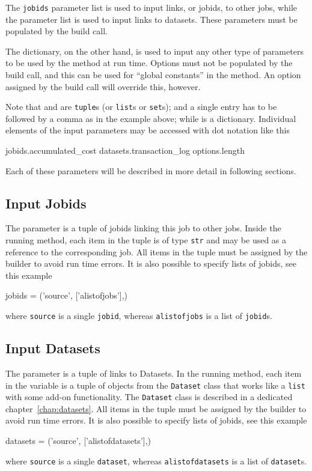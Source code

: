 The \texttt{jobids} parameter list is used to input links, or jobids,
to other jobs, while the \datasets parameter list is used to input
links to datasets.  These parameters must be populated by the build
call.

The \options dictionary, on the other hand, is used to input any other
type of parameters to be used by the method at run time.  Options must
not be populated by the build call, and this can be used for ``global
constants'' in the method.  An option assigned by the build call will
override this, however.

Note that \jobids and \datasets are \texttt{tuple}s (or \texttt{list}s
or \texttt{set}s); and a single entry has to be followed by a comma as
in the example above; while \options is a dictionary.  Individual
elements of the input parameters may be accessed with dot notation
like this
\begin{python}
jobids.accumulated_cost
datasets.transaction_log
options.length
\end{python}
Each of these parameters will be described in more detail in following
sections.




\subsection*{Input Jobids}
The \jobids parameter is a tuple of jobids linking this job to other
jobs.  Inside the running method, each item in the \jobids tuple is of
type \texttt{str} and may be used as a reference to the corresponding
job.  All items in the \jobids tuple must be assigned by the builder to
avoid run time errors.
It is also possible to specify lists of jobids, see this example
\begin{python}
jobids = ('source', ['alistofjobs'],)
\end{python}
where \texttt{source} is a single \texttt{jobid}, whereas
\texttt{alistofjobs} is a list of \texttt{jobid}s.



\subsection*{Input Datasets}
The \datasets parameter is a tuple of links to Datasets.  In the
running method, each item in the \datasets variable is a tuple of
objects from the \texttt{Dataset} class that works like
a \texttt{list} with some add-on functionality.  The \texttt{Dataset}
class is described in a dedicated chapter~\ref{chap:datasets}.
All items in the \datasets tuple must be assigned by the builder to
avoid run time errors.
It is also possible to specify lists of jobids, see this example
\begin{python}
datasets = ('source', ['alistofdatasets'],)
\end{python}
where \texttt{source} is a single \texttt{dataset}, whereas
\texttt{alistofdatasets} is a list of \texttt{dataset}s.





